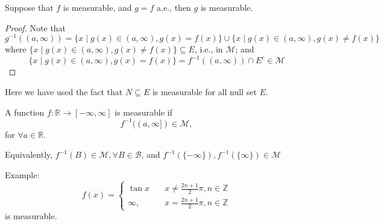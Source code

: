 \begin{proposition}
Suppose that $f$ is measurable, and $g=f$ a.e., then $g$ is measurable.
\end{proposition}
\begin{proof}
Note that 
\[
g^{-1}((a,\infty)) = \{x\mid g(x)\in(a,\infty), g(x)=f(x)\}\cup
\{x\mid g(x)\in(a,\infty), g(x)\ne f(x)\}
\]
where $\{x\mid g(x)\in(a,\infty), g(x)\ne f(x)\}\subseteq E$, i.e., in $\mathcal{M}$;
and
\[
 \{x\mid g(x)\in(a,\infty), g(x)=f(x)\} = f^{-1}((a,\infty))\cap E^c\in\mathcal{M}
\]

\end{proof}

\begin{remark}
Here we have used the fact that $N\subseteq E$ is measurable for all null set $E$.
\end{remark}

\begin{definition}
A function $f:\mathbb{R}\to[-\infty,\infty]$ is measurable if 
\[
f^{-1}((a,\infty])\in\mathcal{M},
\]
for $\forall a\in\mathbb{R}$.

Equivalently, $f^{-1}(B)\in\mathcal{M},\forall B\in\mathcal{B}$, and $f^{-1}(\{-\infty\}),f^{-1}(\{\infty\})\in\mathcal{M}$
\end{definition}
Example:
\[
f(x)=\left\{
\begin{aligned}
\tan x&\quad x\ne\frac{2n+1}{2}\pi, n\in\mathbb{Z}\\
\infty,&\quad x=\frac{2n+1}{2}\pi, n\in\mathbb{Z}
\end{aligned}
\right.
\]
is measurable.






















